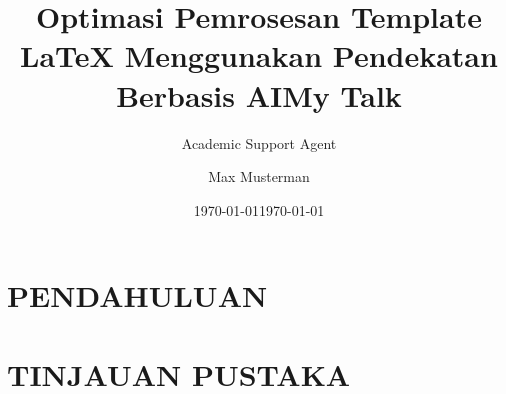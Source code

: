 \documentclass{beamer}
\title{Optimasi Pemrosesan Template LaTeX Menggunakan Pendekatan Berbasis AI}
\author{Academic Support Agent}
\date{\today}
\begin{document}
\maketitle

\begin{abstract}

\end{abstract}

\chapter{PENDAHULUAN}


\chapter{TINJAUAN PUSTAKA}


\usepackage[english]{babel}

\usepackage{amsmath,amssymb}
\usepackage{graphicx}

\newcommand{\vsep}{
  \column{0.0\textwidth}
    \begin{tikzpicture}
      \draw[very thick,black!10] (0,0) -- (0,7.3);
    \end{tikzpicture}
}

\setlength{\mathindent}{0pt}


\setlength{\jot}{0pt}


\title{My Talk}
\author{Max Musterman}
\date{\today}
\end{document}
